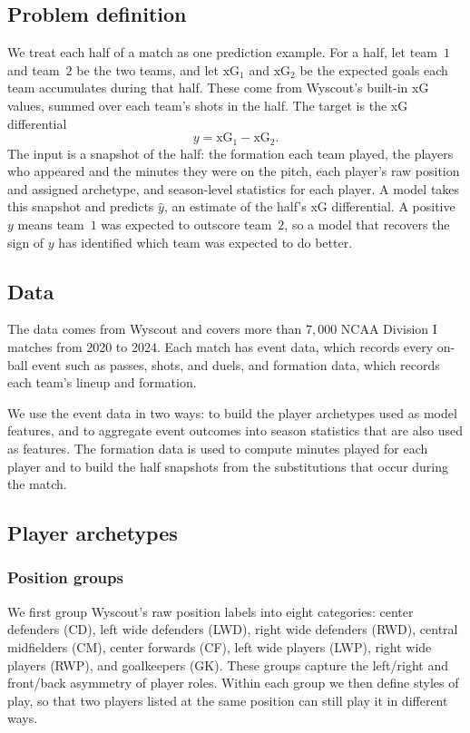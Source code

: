 \documentclass[11pt,twocolumn]{article}
\begin{document}
\subsection{Problem definition}
We treat each half of a match as one prediction example. For a half, let
team~$1$ and team~$2$ be the two teams, and let $\mathrm{xG}_1$ and
$\mathrm{xG}_2$ be the expected goals each team accumulates during that
half. These come from Wyscout's built-in xG values, summed over each
team's shots in the half. The target is the xG differential
\[
  y = \mathrm{xG}_1 - \mathrm{xG}_2 .
\]
The input is a snapshot of the half: the formation each team played, the
players who appeared and the minutes they were on the pitch, each
player's raw position and assigned archetype, and season-level statistics
for each player. A model takes this snapshot and predicts $\hat{y}$, an
estimate of the half's xG differential. A positive $y$ means team~$1$ was
expected to outscore team~$2$, so a model that recovers the sign of $y$
has identified which team was expected to do better.

\subsection{Data}
The data comes from Wyscout and covers more than
$7{,}000$ NCAA Division I matches from 2020 to 2024. Each match has event
data, which records every on-ball event such as passes, shots, and duels,
and formation data, which records each team's lineup and formation.

We use the event data in two ways: to build the player archetypes used as
model features, and to aggregate event outcomes into season statistics
that are also used as features. The formation data is used to compute
minutes played for each player and to build the half snapshots from the
substitutions that occur during the match.

\subsection{Player archetypes}

\subsubsection{Position groups}
We first group Wyscout's raw position labels into eight categories:
center defenders (CD), left wide defenders (LWD), right wide defenders
(RWD), central midfielders (CM), center forwards (CF), left wide players
(LWP), right wide players (RWP), and goalkeepers (GK). These groups
capture the left/right and front/back asymmetry of player roles. Within
each group we then define styles of play, so that two players listed at
the same position can still play it in different ways.
\end{document}

